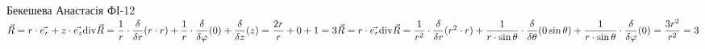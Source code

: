 \documentclass[a4paper,12pt]{article}
\newcommand{\Div}{{\textrm{div}}}
\begin{document}
	 Бекешева Анастасія ФІ-12\\$\vec{R}=r\cdot\vec{e_r}+z\cdot\vec{e_z}\\\Div\vec{R}=\dfrac1r\cdot\dfrac{\delta}{\delta r}(r\cdot r)+\dfrac1r\cdot\dfrac{\delta}{\delta\varphi}(0)+\dfrac{\delta}{\delta z}(z)=\dfrac{2r}r+0+1=3\\\vec{R}=r\cdot\vec{e_r}\\\Div\vec{R}=\dfrac1{r^2}\cdot\dfrac{\delta}{\delta r}(r^2\cdot r)+\dfrac{1}{r\cdot\sin\theta}\cdot\dfrac{\delta}{\delta\theta}(0\sin\theta)+\dfrac{1}{r\cdot\sin\theta}\cdot\dfrac{\delta}{\delta\varphi}(0)=\dfrac{3r^2}{r^2}=3$
\end{document}
